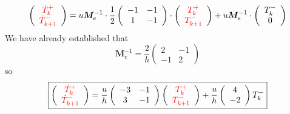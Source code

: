 \begin{eqnarray}
\left(
\begin{array}{cc}
{\color{red}\dot T_k^+}  \\
{\color{red} \dot T_{k+1}^-} 
\end{array}
\right) 
=
u
{\bm M}_e^{-1} \cdot\frac{1}{2}  
\left(\begin{array}{cc}
-1 & -1 \\
1 & -1 
\end{array}\right)
 \cdot 
\left( \begin{array}{cc}
{\color{red}T_k^+}  \\
{\color{red}T_{k+1}^-} 
\end{array} \right) 
+u 
{\bm M}_e^{-1} \cdot
\left( \begin{array}{cc}
{T_{k}^-}   \\  0 
\end{array} \right)
\end{eqnarray}
We have already established that 
\[
{\bm M}_e^{-1} = 
\frac{2}{h}
\left( 
\begin{array}{cc}
2 & -1 \\
-1 & 2
\end{array}
\right)
\]
so 
\begin{eqnarray}
\boxed{
\left(
\begin{array}{cc}
{\color{red}\dot T_k^+}  \\
{\color{red} \dot T_{k+1}^-} 
\end{array}
\right)=
\frac{u}{h} 
\left(\begin{array}{cc}
    -3 & -1 \\
     3 & -1
\end{array}
\right)
\left(
\begin{array}{cc}
{\color{red}T_k^+}  \\
{\color{red}T_{k+1}^-} 
\end{array}
\right) + \frac{u}{h} \left(
\begin{array}{cc}
4   \\
-2 
\end{array}
\right)T_k^-  
}
\end{eqnarray}

